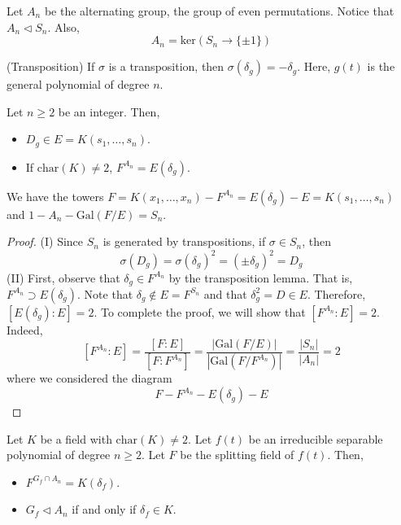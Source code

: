 \vspace{2ex}
\begin{recall}
Let $A_{n}$ be the alternating group, the group of even permutations. Notice that $A_{n}\triangleleft S_{n}$. Also,
\[A_{n}=\mathrm{ker}(S_{n}\rightarrow \{\pm 1\})\]
\end{recall}
\vspace{2ex}
\begin{lem}
(Transposition) If $\sigma $ is a transposition, then $\sigma (\delta _{g})=-\delta _{g}$. Here, $g(t)$ is the general polynomial of degree $n$. 
\end{lem}
\vspace{2ex}
\begin{thm}
Let $n\geq 2$ be an integer. Then, 
\begin{itemize}
\item[(i)] $D_{g}\in E=K(s_1,\ldots ,s_{n})$.
\item[(ii)] If $\mathrm{char}(K)\ne 2$, $F^{A_{n}}=E(\delta _{g})$.
\end{itemize}
We have the towers $F=K(x_1,\ldots ,x_{n})-F^{A_{n}}=E(\delta _{g})-E=K(s_1,\ldots ,s_{n})$ and $1-A_{n}-\mathrm{Gal}(F/E)=S_{n}$.
\end{thm}
\vspace{2ex}
\begin{proof}
(I) Since $S_{n}$ is generated by transpositions, if $\sigma \in S_{n}$, then 
\[\sigma (D_{g})=\sigma (\delta _{g})^2=(\pm \delta _{g})^2=D_{g}\]
(II) First, observe that $\delta _{g}\in F^{A_{n}}$ by the transposition lemma. That is, $F^{A_{n}}\supset E(\delta _{g})$. Note that $\delta _{g}\notin E=F^{S_{n}}$ and that $\delta _{g}^2=D\in E$. Therefore, $[E(\delta _{g}):E]=2$. To complete the proof, we will show that $[F^{A_{n}}:E]=2$. Indeed,
\[[F^{A_{n}}:E]=\dfrac{[F:E]}{[F:F^{A_{n}}]}=\dfrac{|\mathrm{Gal}(F/E)|}{|\mathrm{Gal}(F/F^{A_{n}})|}=\dfrac{|S_{n}|}{|A_{n}|}=2\]
where we considered the diagram
\[F-F^{A_{n}}-E(\delta _{g})-E\]
\end{proof}
\vspace{2ex}
\begin{cor}
Let $K$ be a field with $\mathrm{char}(K)\ne 2$. Let $f(t)$ be an irreducible separable polynomial of degree $n\geq 2$. Let $F$ be the splitting field of $f(t)$. Then,
\begin{itemize}
\item[(i)] $F^{G_{f}\cap A_{n}}=K(\delta _{f})$.
\item[(ii)] $G_{f}\triangleleft A_{n}$ if and only if $\delta _{f}\in K$.
\end{itemize}
\end{cor}
